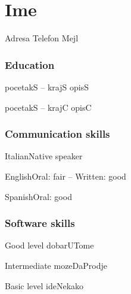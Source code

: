\documentclass{tccv}
\begin{document}
\part{Ime}
\personal
    {Adresa}
    {Telefon}
    {Mejl}
\section{Education}
\begin{yearlist}
\item[]{pocetakS -- krajS}
     {opisS}
     {}
\item{pocetakS -- krajC}
     {opisC}
     {}
\end{yearlist}
\section{Communication skills}
\begin{factlist}
\item{Italian}{Native speaker}
\item{English}{Oral: fair -- Written: good}
\item{Spanish}{Oral: good}
\end{factlist}

\section{Software skills}
\begin{factlist}
\item{Good level}
     {dobarUTome}
\item{Intermediate}
     {mozeDaProdje}
\item{Basic level}
     {ideNekako}
\end{factlist}
\pagebreak
\end{document}
